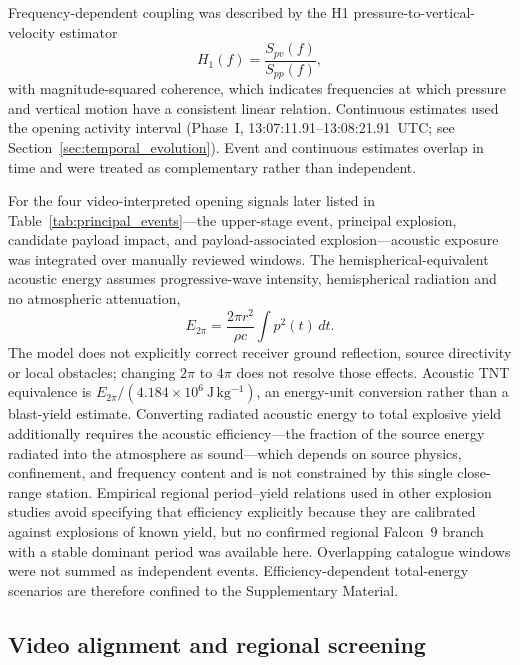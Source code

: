 \documentclass[]{seismica}
\begin{document}
Frequency-dependent coupling was described by the H1 pressure-to-vertical-velocity estimator
\begin{equation}
 H_1(f)=\frac{S_{pv}(f)}{S_{pp}(f)},
 \label{eq:h1_transfer}
\end{equation}
with magnitude-squared coherence, which indicates frequencies at which
pressure and vertical motion have a consistent linear relation. Continuous estimates used the opening activity interval
(Phase~I, 13:07:11.91--13:08:21.91~UTC; see Section~\ref{sec:temporal_evolution}).
Event and continuous estimates overlap in time and were treated as
complementary rather than independent.

For the four video-interpreted opening signals later listed in
Table~\ref{tab:principal_events}---the upper-stage event, principal explosion,
candidate payload impact, and payload-associated explosion---acoustic exposure
was integrated over manually reviewed windows. The hemispherical-equivalent
acoustic energy assumes progressive-wave intensity, hemispherical radiation
and no atmospheric attenuation,
\begin{equation}
 E_{2\pi}=\frac{2\pi r^2}{\rho c}\int p^2(t)\,dt.
 \label{eq:acoustic_energy}
\end{equation}
The model does not explicitly correct receiver ground reflection, source
directivity or local obstacles; changing $2\pi$ to $4\pi$ does not resolve
those effects. Acoustic TNT equivalence is $E_{2\pi}/(4.184\times10^6~\mathrm{J\,kg^{-1}})$,
an energy-unit conversion rather than a blast-yield estimate. Converting
radiated acoustic energy to total explosive yield additionally requires the
acoustic efficiency---the fraction of the source energy radiated into the
atmosphere as sound---which depends on source physics, confinement, and
frequency content and is not constrained by this single close-range station.
Empirical regional period--yield relations used in other explosion studies
avoid specifying that efficiency explicitly because they are calibrated
against explosions of known yield, but no confirmed regional Falcon~9 branch
with a stable dominant period was available here. Overlapping catalogue
windows were not summed as independent events. Efficiency-dependent
total-energy scenarios are therefore confined to the Supplementary Material.

\subsection{Video alignment and regional screening}
\end{document}
